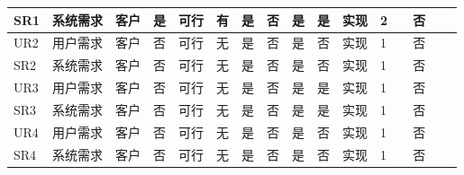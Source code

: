 \documentclass[a4paper]{ctexart}
\begin{document}
{\begin{longtable}{|P{4em}|P{4em}|P{2em}|P{2em}|P{2em}|P{1em}|P{3em}|P{3em}|P{4em}|P{4em}|P{2em}|P{2em}|P{3em}|P{3em}|P{4em}|P{4em}|}
  \hline
  SR1                                          & 系统需求                            & 客户                                         & 是                                            & 可行                    & 有   & 是           & 否           & 是             & 是             & 实现     & 2      &            & 否           &                 &                        \\
  \hline
  UR2                                          & 用户需求                            & 客户                                         & 否                                            & 可行                    & 无   & 是           & 否           & 是             & 否             & 实现     & 1      &            & 否           &                 &                        \\
  \hline
  SR2                                          & 系统需求                            & 客户                                         & 否                                            & 可行                    & 无   & 是           & 否           & 是             & 否             & 实现     & 1      &            & 否           &                 &                        \\
  \hline
  UR3                                          & 用户需求                            & 客户                                         & 否                                            & 可行                    & 无   & 是           & 否           & 是             & 是             & 实现     & 1      &            & 否           &                 &                        \\
  \hline
  SR3                                          & 系统需求                            & 客户                                         & 否                                            & 可行                    & 无   & 是           & 否           & 是             & 是             & 实现     & 1      &            & 否           &                 &                        \\
  \hline
  UR4                                          & 用户需求                            & 客户                                         & 否                                            & 可行                    & 无   & 是           & 否           & 是             & 否             & 实现     & 1      &            & 否           &                 &                        \\
  \hline
  SR4                                          & 系统需求                            & 客户                                         & 否                                            & 可行                    & 无   & 是           & 否           & 是             & 否             & 实现     & 1      &            & 否           &                 &                        \\

\end{longtable}}
\end{document}
